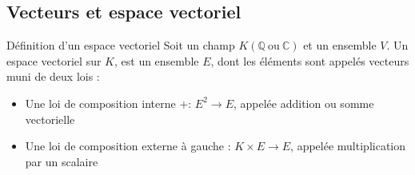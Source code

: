 \documentclass[a4paper]{article}
\begin{document}
	\subsection{Vecteurs et espace vectoriel}
	\begin{parag}{Définition d'un espace vectoriel}
		Soit un champ $K(\mathbb{Q}\ \text{ou}\ \mathbb{C})$ et un ensemble $V$. Un espace vectoriel sur $K$, est un ensemble $E$, dont les éléments sont appelés vecteurs muni de deux lois :
		 \begin{itemize}
			 \item Une loi de composition interne \guillemotleft+\guillemotright : $E^2 \to E$, appelée addition ou somme vectorielle
			 \item Une loi de composition externe à gauche \guillemotleft\cdot\guillemotright : $K \times E \to E$, appelée multiplication par un scalaire
		\end{itemize}


\end{parag}
\end{document}
